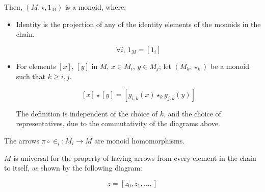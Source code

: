 \documentclass{article}
\begin{document}
\begin{enumerate}
\begin{itemize}

         
         Then, $(M, \star, 1_M)$ is a monoid, where:

         \begin{itemize}
           
           \item Identity is the projection of any of the identity
             elements of the monoids in the chain.
             
         $$\forall i,\,1_M = \left [ 1_{i} \right ]$$
           \item  
         For elements $[x]$, $[y]$ in $M$, $x \in M_i$, $y \in M_j$; let
         $(M_k, \star_k)$ be a monoid such that $k \geq i,j$.

         $$[x] \star [y] = \left [ g_{i,k}(x) \star_k g_{j,k}(y) \right ]$$

         The definition is independent of the choice of $k$, and the
         choice of representatives, due to the commutativity of the
         diagrams above.

         \end{itemize}
         
         The arrows $\pi \circ \in_i : M_i → M$ are monoid homomorphisms.

         $M$ is universal for the property of having arrows from every
         element in the chain to itself, as shown by the following diagram:
 

         $$z = \left [ z_0, z_1, …, \right ]  $$


\end{itemize}
\end{enumerate}
\end{document}
